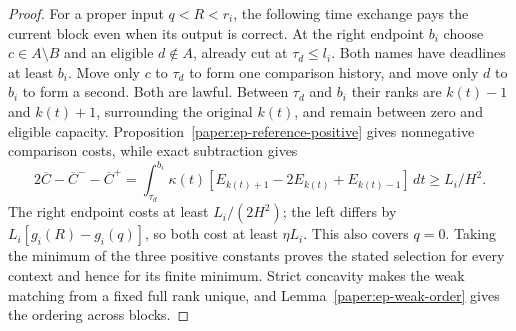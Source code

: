 \begin{proof}
For a proper input $q<R<r_i$, the following time exchange pays the
current block even when its output is correct.  At the right endpoint
$b_i$ choose $c\in A\setminus B$ and an eligible $d\notin A$,
already cut at $\tau_d\leq l_i$.  Both names have deadlines at least
$b_i$.  Move only $c$ to $\tau_d$ to form one comparison history,
and move only $d$ to $b_i$ to form a second.  Both are lawful.  Between
$\tau_d$ and $b_i$ their ranks are $k(t)-1$ and $k(t)+1$, surrounding
the original $k(t)$, and remain between zero and eligible capacity.
Proposition~\ref{paper:ep-reference-positive} gives nonnegative
comparison costs, while exact subtraction gives
\[
 2\overline C-\overline C^- -\overline C^+
 =\int_{\tau_d}^{b_i}\kappa(t)
       [E_{k(t)+1}-2E_{k(t)}+E_{k(t)-1}]\,dt
 \geq L_i/H^2.
\]
The right endpoint costs at least $L_i/(2H^2)$; the left differs by
$L_i[g_i(R)-g_i(q)]$, so both cost at least $\eta L_i$.
This also covers $q=0$.  Taking the minimum of the three positive
constants proves the stated selection for every context and hence
for its finite minimum.  Strict concavity makes the weak matching
from a fixed full rank unique, and
Lemma~\ref{paper:ep-weak-order} gives the ordering across blocks.
\end{proof}

